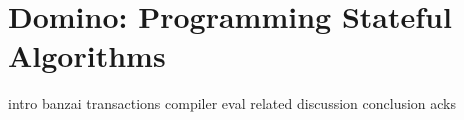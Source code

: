 \chapter{Domino: Programming Stateful Algorithms}
{intro}
{banzai}
{transactions}
{compiler}
{eval}
{related}
{discussion}
{conclusion}
{acks}

